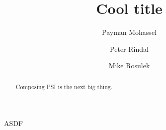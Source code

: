 \documentclass[11pt,letterpaper]{article}
\title{Cool title}
\author{Payman Mohassel \and Peter Rindal \and Mike Rosulek }
\begin{document}
\maketitle

\begin{abstract}
Composing PSI is the next big thing.
\end{abstract}


ASDF
\end{document}
